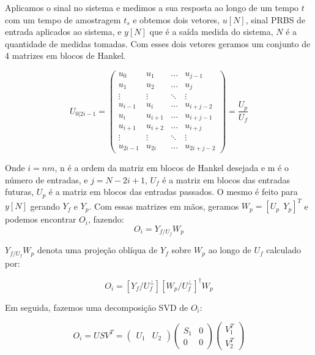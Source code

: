 Aplicamos o sinal no sistema e medimos a sua resposta ao longo de um tempo $t$ com um tempo de amostragem $t_s$ e obtemos dois vetores, $u[N]$, sinal PRBS de entrada aplicados ao sistema, e $y[N]$ que é a saída medida do sistema, $N$ é a quantidade de medidas tomadas. Com esses dois vetores geramos um conjunto de 4 matrizes em blocos de Hankel.

\begin{equation}\label{eq:matrizhankel}
U_{0|2i-1}=
\begin{pmatrix}
u_0 & u_1 & \dots & u_{j-1} \\
u_1 & u_2 & \dots & u_{j} \\
\vdots & \vdots & \ddots & \vdots\\
u_{i-1} & u_i & \dots & u_{i+j-2}\\
\hline
u_i & u_{i+1} & \dots & u_{i+j-1}\\
u_{i+1} & u_{i+2} & \dots & u_{i+j}\\
\vdots & \vdots & \ddots & \vdots\\
u_{2i-1} & u_{2i} & \dots & u_{2i+j-2}
\end{pmatrix}
=\dfrac{U_p}{U_f}
\end{equation}

Onde $i=nm$, n é a ordem da matriz em blocos de Hankel desejada e m é o número de entradas, e $j=N-2i+1$, $U_f$ é a matriz em blocos das entradas futuras, $U_p$ é a matriz em blocos das entradas passados. O mesmo é feito para $y[N]$ gerando $Y_f$ e $Y_p$. Com essas matrizes em mãos, geramos $W_p=[U_p~~Y_p]^T$ e podemos encontrar $O_i$, fazendo:
\begin{equation}\label{eq:oi}
O_i=Y_{f/U_f} W_p
\end{equation}

$Y_{f/U_f}W_p$ denota uma projeção oblíqua de $Y_f$ sobre $W_p$ ao longo de $U_f$ calculado por:

\begin{equation}\label{eq:oiexp}
O_i=[Y_f/U_f^\perp][W_p/U_f^\perp]^\dagger W_p
\end{equation}

Em seguida, fazemos uma decomposição SVD de $O_i$:

\begin{equation}\label{eq:svd}
O_i=USV^T=\begin{pmatrix}
U_1 &U_2
\end{pmatrix}\begin{pmatrix}
S_1 & 0\\ 0 & 0
\end{pmatrix} 
\begin{pmatrix}
V_1^T \\ V_2^T
\end{pmatrix}
\end{equation}

